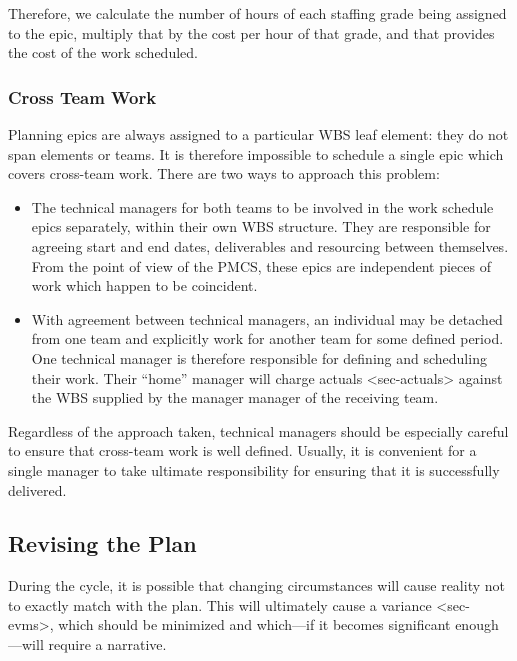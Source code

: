 Therefore, we calculate the number of hours of each staffing grade being
assigned to the epic, multiply that by the cost per hour of that grade,
and that provides the cost of the work scheduled.

\subsubsection{Cross Team Work}\label{cross-team-work}

Planning epics are always assigned to a particular WBS leaf element:
they do not span elements or teams. It is therefore impossible to
schedule a single epic which covers cross-team work. There are two ways
to approach this problem:

\begin{itemize}
\item
  The technical managers for both teams to be involved in the work
  schedule epics separately, within their own WBS structure. They are
  responsible for agreeing start and end dates, deliverables and
  resourcing between themselves. From the point of view of the PMCS,
  these epics are independent pieces of work which happen to be
  coincident.
\item
  With agreement between technical managers, an individual may be
  detached from one team and explicitly work for another team for some
  defined period. One technical manager is therefore responsible for
  defining and scheduling their work. Their ``home'' manager will charge
  actuals \textless{}sec-actuals\textgreater{} against the WBS supplied
  by the manager manager of the receiving team.
\end{itemize}

Regardless of the approach taken, technical managers should be
especially careful to ensure that cross-team work is well defined.
Usually, it is convenient for a single manager to take ultimate
responsibility for ensuring that it is successfully delivered.

\subsection{Revising the Plan}\label{revising-the-plan}

During the cycle, it is possible that changing circumstances will cause
reality not to exactly match with the plan. This will ultimately cause a
variance \textless{}sec-evms\textgreater{}, which should be minimized
and which---if it becomes significant enough---will require a narrative.

